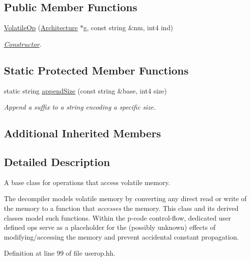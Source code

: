 \subsection*{Public Member Functions}
\begin{DoxyCompactItemize}
\item 
\mbox{\hyperlink{class_volatile_op_af8e858394ba7b9ae030a30ebb90ed73c}{Volatile\+Op}} (\mbox{\hyperlink{class_architecture}{Architecture}} $\ast$g, const string \&nm, int4 ind)
\begin{DoxyCompactList}\small\item\em \mbox{\hyperlink{class_constructor}{Constructor}}. \end{DoxyCompactList}\end{DoxyCompactItemize}
\subsection*{Static Protected Member Functions}
\begin{DoxyCompactItemize}
\item 
static string \mbox{\hyperlink{class_volatile_op_a49723e93482e3ece0899463711b2ba6b}{append\+Size}} (const string \&base, int4 size)
\begin{DoxyCompactList}\small\item\em Append a suffix to a string encoding a specific size. \end{DoxyCompactList}\end{DoxyCompactItemize}
\subsection*{Additional Inherited Members}


\subsection{Detailed Description}
A base class for operations that access volatile memory. 

The decompiler models volatile memory by converting any direct read or write of the memory to a function that {\itshape accesses} the memory. This class and its derived classes model such functions. Within the p-\/code control-\/flow, dedicated user defined ops serve as a placeholder for the (possibly unknown) effects of modifying/accessing the memory and prevent accidental constant propagation. 

Definition at line 99 of file userop.\+hh.



